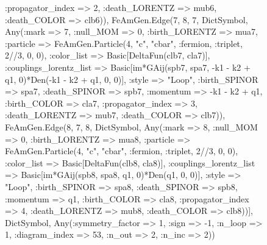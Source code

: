 \documentclass{revtex4}
\begin{document}
\begin{figure}[!htb]
\begin{center}
{:propagator_index => 2, :death_LORENTZ => mub6, :death_COLOR => clb6)), FeAmGen.Edge(7, 8, 7, Dict{Symbol, Any}(:mark => 7, :null_MOM => 0, :birth_LORENTZ => mua7, :particle => FeAmGen.Particle(4, "c", "cbar", :fermion, :triplet, 2//3, 0, 0), :color_list => Basic[DeltaFun(clb7, cla7)], :couplings_lorentz_list => Basic[im*GAij(spb7, spa7, -k1 - k2 + q1, 0)*Den(-k1 - k2 + q1, 0, 0)], :style => "Loop", :birth_SPINOR => spa7, :death_SPINOR => spb7, :momentum => -k1 - k2 + q1, :birth_COLOR => cla7, :propagator_index => 3, :death_LORENTZ => mub7, :death_COLOR => clb7)), FeAmGen.Edge(8, 7, 8, Dict{Symbol, Any}(:mark => 8, :null_MOM => 0, :birth_LORENTZ => mua8, :particle => FeAmGen.Particle(4, "c", "cbar", :fermion, :triplet, 2//3, 0, 0), :color_list => Basic[DeltaFun(clb8, cla8)], :couplings_lorentz_list => Basic[im*GAij(spb8, spa8, q1, 0)*Den(q1, 0, 0)], :style => "Loop", :birth_SPINOR => spa8, :death_SPINOR => spb8, :momentum => q1, :birth_COLOR => cla8, :propagator_index => 4, :death_LORENTZ => mub8, :death_COLOR => clb8))], Dict{Symbol, Any}(:symmetry_factor => 1, :sign => -1, :n_loop => 1, :diagram_index => 53, :n_out => 2, :n_inc => 2)) 
}
\end{center}
\end{figure}
\end{document}
